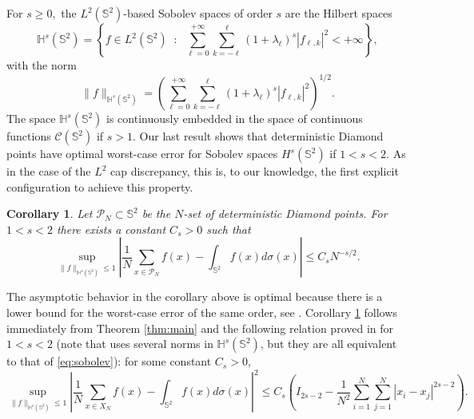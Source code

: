 \documentclass[11pt]{amsart}
\newtheorem{corollary}{Corollary}
\newcommand{\Sph}{\mathbb S^2}
\newcommand{\cP}{\mathcal P}
\begin{document}
For $s\ge 0,$ the $L^2(\mathbb{S}^2)$-based Sobolev spaces of order $s$ are the Hilbert spaces
$$\mathbb{H}^{s}(\mathbb{S}^2)=\left\{ f\in L^2(\mathbb{S}^2)\;\;:\;\;
\sum_{\ell=0}^{+\infty}\sum_{k=-\ell}^{\ell} (1+\lambda_\ell)^s |f_{\ell,k}|^2<+\infty \right\},$$
with the norm
\begin{equation}\label{eq:sobolev}\| f \|_{\mathbb{H}^{s}(\mathbb{S}^2)}=\left( \sum_{\ell=0}^{+\infty}\sum_{k=-\ell}^{\ell} (1+\lambda_\ell)^s |f_{\ell,k}|^2  \right)^{1/2}.\end{equation}
The space
$\mathbb{H}^{s}(\mathbb{S}^2)$ is continuously embedded in the space of continuous functions $\mathcal{C}(\mathbb{S}^2)$ if $s >1.$ Our last result shows that deterministic Diamond points have optimal worst-case error for Sobolev spaces $H^s(\Sph)$ if $1<s<2.$ As in the case of the $L^2$ cap discrepancy, this is, to our knowledge, the first explicit configuration to
achieve this property.

\begin{corollary}\label{cor:wce}
Let $\cP_N\subset\mathbb S^2$ be the $N$-set of deterministic Diamond points. For $1<s<2$ there exists a constant
$C_s>0$ such that
$$\sup_{\| f \|_{\mathbb{H}^{s}(\mathbb{S}^2)}\le 1}
\left| \frac{1}{N}\sum_{x\in \cP_N}f(x)-\int_{\mathbb{S}^2}f(x)d\sigma(x) \right| \le C_s N^{-s/2}.$$
\end{corollary}

The asymptotic behavior in the corollary above is optimal because %
there is a lower bound for the worst-case error of the same order, see  \cite{BSSW14}. Corollary \ref{cor:wce} follows immediately from Theorem \ref{thm:main} and the following relation proved in \cite[(29)]{BSSW14} for $1<s<2$ (note that \cite{BSSW14} uses several norms in $\mathbb{H}^{s}(\mathbb{S}^2)$, but they are all equivalent to that of \eqref{eq:sobolev}): for some constant $C_s>0$,
$$\sup_{\| f \|_{\mathbb{H}^{s}(\mathbb{S}^2)}\le 1}
\left| \frac{1}{N}\sum_{x\in X_N}f(x)-\int_{\mathbb{S}^2}f(x)d\sigma(x) \right|^2\leq C_s\left(
I_{2s-2}-\frac{1}{N^2}\sum_{i=1}^N\sum_{j=1}^N|x_i-x_j|^{2s-2}\right).$$





\end{document}
